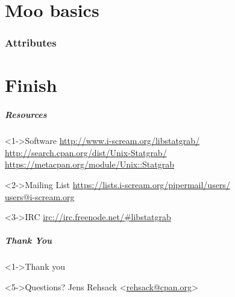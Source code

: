 \documentclass[ngerman,xcolor={table,dvipsnames},smaller,compress,hyperref={bookmarks,colorlinks}]{beamer}
\begin{document}
\part{Moo basics}

\section{Attributes}

\part{Finish}

\begin{frame}[fragile]
\frametitle{Resources}
\begin{block}<1->{Software}
\url{http://www.i-scream.org/libstatgrab/} \\
\url{http://search.cpan.org/dist/Unix-Statgrab/} \\
\url{https://metacpan.org/module/Unix::Statgrab}
\end{block}

\begin{block}<2->{Mailing List}
\url{https://lists.i-scream.org/pipermail/users/} \\
\url{users@i-scream.org}
\end{block}

\begin{block}<3->{IRC}
\url{irc://irc.freenode.net/#libstatgrab}
\end{block}
\end{frame}

\begin{frame}[fragile]
\frametitle{Thank You}
\begin{block}<1->{Thank you}
\begin{itemize}
\end{itemize}
\end{block}
\begin{block}<5->{Questions?}
Jens Rehsack \textless{}\href{mailto:rehsack@cpan.org}{rehsack@cpan.org}\textgreater{}
\end{block}
\end{frame}

\end{document}
